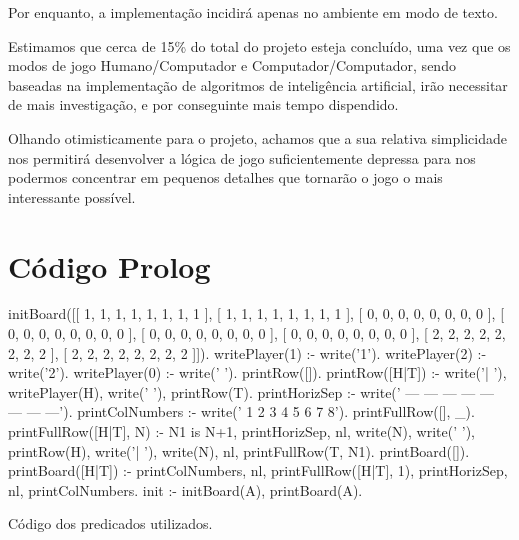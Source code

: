 \documentclass[15pt,a4paper]{article}
\begin{document}
Por enquanto, a implementação incidirá apenas no ambiente em modo de texto.

Estimamos que cerca de 15\% do total do projeto esteja concluído, uma vez que os modos de jogo Humano/Computador e Computador/Computador, sendo baseadas na implementação de algoritmos de inteligência artificial, irão necessitar de mais investigação, e por conseguinte mais tempo dispendido.

Olhando otimisticamente para o projeto, achamos que a sua relativa simplicidade nos permitirá desenvolver a lógica de jogo suficientemente depressa para nos podermos concentrar em pequenos detalhes que tornarão o jogo o mais interessante possível.



\clearpage

\renewcommand\refname{Bibliografia}



\nocite{tut1}
\nocite{tut2}


\newpage

\appendix
\section{Código Prolog}

\begin{code}[H]
	\begin{verbatimtab} %
initBoard([[ 1, 1, 1, 1, 1, 1, 1, 1 ],
	   [ 1, 1, 1, 1, 1, 1, 1, 1 ],
	   [ 0, 0, 0, 0, 0, 0, 0, 0 ],
	   [ 0, 0, 0, 0, 0, 0, 0, 0 ],
	   [ 0, 0, 0, 0, 0, 0, 0, 0 ],
	   [ 0, 0, 0, 0, 0, 0, 0, 0 ],
	   [ 2, 2, 2, 2, 2, 2, 2, 2 ],
	   [ 2, 2, 2, 2, 2, 2, 2, 2 ]]).
writePlayer(1) :-
	write('1').
writePlayer(2) :-
	write('2').
writePlayer(0) :-
	write(' ').
printRow([]).
printRow([H|T]) :-
	write('| '),
	writePlayer(H),
	write(' '),
	printRow(T).
printHorizSep   :-
	write('   --- --- --- --- --- --- --- ---').
printColNumbers :-
	write('    1   2   3   4   5   6   7   8').
printFullRow([], _).
printFullRow([H|T], N) :-
	N1 is N+1,
	printHorizSep,
	nl,
	write(N),
	write(' '),
	printRow(H),
	write('| '),
	write(N),
	nl,
	printFullRow(T, N1).
printBoard([]).
printBoard([H|T]) :-
	printColNumbers,
	nl,
	printFullRow([H|T], 1),
	printHorizSep,
	nl,
	printColNumbers.
init :-
	initBoard(A),
	printBoard(A).
\end{verbatimtab}
\caption{Código dos predicados utilizados.}
\end{code}
\end{document}
